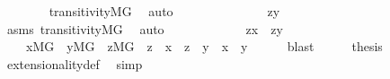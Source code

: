 \begin{isabellebody}
\ \ \ \ \ \ \isamarkupfalse%
\ transitivity{\isacharunderscore}{\kern0pt}MG\ \isamarkupfalse%
\ auto\isanewline
\ \ \ \ \isamarkupfalse%
\ \isamarkupfalse%
\isanewline
\ \ \ \ \ \ {\isachardoublequoteopen}{\isachardot}{\kern0pt}{\isachardot}{\kern0pt}{\isachardot}{\kern0pt}\ {\isasymlongleftrightarrow}\ z{\isasymin}y{\isachardoublequoteclose}\isanewline
\ \ \ \ \ \ \isamarkupfalse%
\ asms\ transitivity{\isacharunderscore}{\kern0pt}MG\ \isamarkupfalse%
\ auto\isanewline
\ \ \ \ \isamarkupfalse%
\ \isamarkupfalse%
\isanewline
\ \ \ \ \ \ {\isachardoublequoteopen}z{\isasymin}x\ {\isasymlongleftrightarrow}\ z{\isasymin}y{\isachardoublequoteclose}\ \isacommand{{\isachardot}{\kern0pt}}\isamarkupfalse%
\isanewline
\ \ \isacommand{{\isacharbraceright}{\kern0pt}}\isamarkupfalse%
\isanewline
\ \ \isamarkupfalse%
\ \isamarkupfalse%
\isanewline
\ \ \ \ {\isachardoublequoteopen}{\isasymforall}x{\isasymin}M{\isacharbrackleft}{\kern0pt}G{\isacharbrackright}{\kern0pt}\ {\isachardot}{\kern0pt}\ {\isasymforall}y{\isasymin}M{\isacharbrackleft}{\kern0pt}G{\isacharbrackright}{\kern0pt}\ {\isachardot}{\kern0pt}\ {\isacharparenleft}{\kern0pt}{\isasymforall}z{\isasymin}M{\isacharbrackleft}{\kern0pt}G{\isacharbrackright}{\kern0pt}\ {\isachardot}{\kern0pt}\ z\ {\isasymin}\ x\ {\isasymlongleftrightarrow}\ z\ {\isasymin}\ y{\isacharparenright}{\kern0pt}\ {\isasymlongrightarrow}\ x\ {\isacharequal}{\kern0pt}\ y{\isachardoublequoteclose}\isanewline
\ \ \ \ \isamarkupfalse%
\ blast\isanewline
\ \ \isamarkupfalse%
\ \isamarkupfalse%
\ {\isacharquery}{\kern0pt}thesis\ \isamarkupfalse%
\ extensionality{\isacharunderscore}{\kern0pt}def\ \isamarkupfalse%
\ simp\isanewline
{}\isamarkupfalse%
%
\endisatagproof
{\isafoldproof}%
%
\isadelimproof
\isanewline
%
\endisadelimproof
\ \isanewline
{}\isamarkupfalse%
\ \ \isanewline
%
\isadelimtheory
%
\endisadelimtheory
%
\isatagtheory
{}\isamarkupfalse%
%
\endisatagtheory
{\isafoldtheory}%
%
\isadelimtheory
%
\endisadelimtheory
%
\end{isabellebody}%
\endinput
